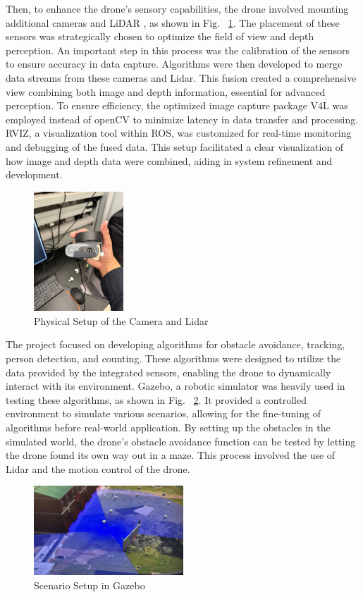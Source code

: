 Then, to enhance the drone's sensory capabilities, the drone involved mounting additional cameras and LiDAR \cite{2d1}, as shown in Fig. ~\ref{fig2d1}. The placement of these sensors was strategically chosen to optimize the field of view and depth perception. An important step in this process was the calibration of the sensors to ensure accuracy in data capture. Algorithms were then developed to merge data streams from these cameras and Lidar. This fusion created a comprehensive view combining both image and depth information, essential for advanced perception. To ensure efficiency, the optimized image capture package V4L was employed instead of openCV to minimize latency in data transfer and processing. RVIZ, a visualization tool within ROS, was customized for real-time monitoring and debugging of the fused data. This setup facilitated a clear visualization of how image and depth data were combined, aiding in system refinement and development.
    \begin{figure}[H]
        \centerline{\includegraphics[width=0.3\textwidth]{Figures/Methods/physical_setup.jpg}}
        \caption{Physical Setup of the Camera and Lidar}
        \label{fig2d1}
    \end{figure}
The project focused on developing algorithms for obstacle avoidance, tracking, person detection, and counting. These algorithms were designed to utilize the data provided by the integrated sensors, enabling the drone to dynamically interact with its environment. Gazebo, a robotic simulator was heavily used in testing these algorithms, as shown in Fig. ~\ref{fig2d2}. It provided a controlled environment to simulate various scenarios, allowing for the fine-tuning of algorithms before real-world application. By setting up the obstacles in the simulated world, the drone's obstacle avoidance function can be tested by letting the drone found its own way out in a maze. This process involved the use of Lidar and the motion control of the drone.

    \begin{figure}[H]
        \centerline{\includegraphics[width=0.5\textwidth]{Figures/Methods/gazebo_lidar.jpg}}
        \caption{Scenario Setup in Gazebo}
        \label{fig2d2}
    \end{figure}
    
